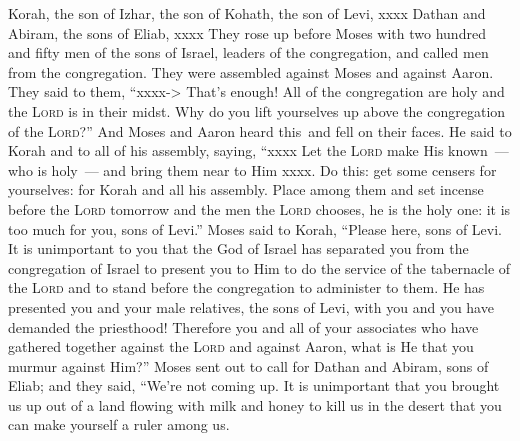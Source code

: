 
\begin{inparaenum}
     Korah, the son of Izhar, the son of Kohath, the son of Levi, xxxx Dathan and Abiram, the sons of Eliab, xxxx%
     They rose up before Moses with two hundred and fifty men of the sons of Israel, leaders of the congregation, and called men from the congregation.%
     They were assembled against Moses and against Aaron. They said to them, ``xxxx-> That's enough! All of the congregation are holy and the \textsc{Lord} is in their midst. Why do you lift yourselves up above the congregation of the \textsc{Lord}?''%
     And Moses and Aaron heard this\understood\ and fell on their faces.%
     He said to Korah and to all of his assembly, saying, ``xxxx Let the \textsc{Lord} make His known~--- who is holy~--- and bring them near to Him xxxx.%
     Do this: get some censers for yourselves: for Korah and all his assembly.%
     Place among them and set incense before the \textsc{Lord} tomorrow and the men the \textsc{Lord} chooses, he is the holy one: it is too much for you, sons of Levi.''%
     Moses said to Korah, ``Please here, sons of Levi.%
     It is unimportant to you that the God of Israel has separated you from the congregation of Israel to present you to Him to do the service of the tabernacle of the \textsc{Lord} and to stand before the congregation to administer to them.%
     He has presented you and your male relatives, the sons of Levi, with you and you have demanded the priesthood!%
     Therefore you and all of your associates who have gathered together against the \textsc{Lord} and against Aaron, what is He that you murmur against Him?''%
     Moses sent out to call for Dathan and Abiram, sons of Eliab; and they said, ``We're not coming up.%
     It is unimportant that you brought us up out of a land flowing with milk and honey to kill us in the desert that you can make yourself a ruler among us.%

\end{inparaenum}

